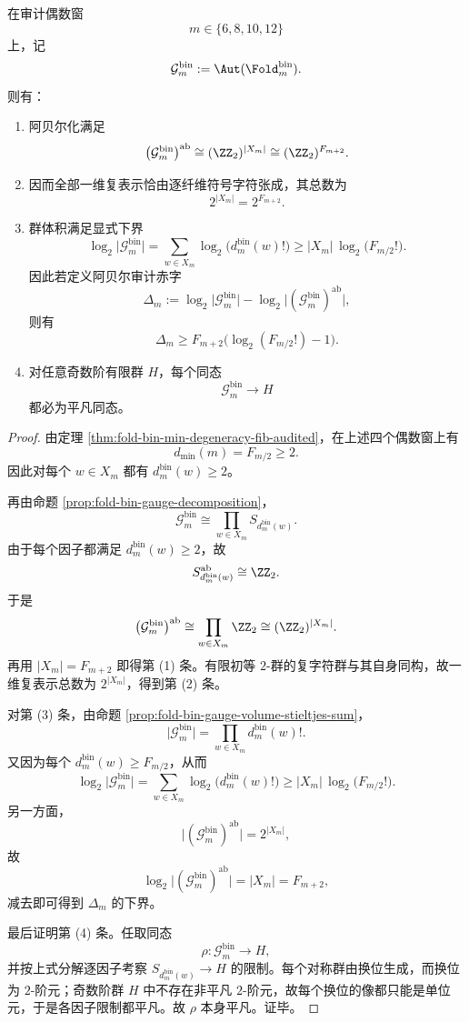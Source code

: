 \begin{theorem}\label{thm:gut-foldbin-gauge-abelian-visible-compression-even-audited}
在审计偶数窗
\[
m\in\{6,8,10,12\}
\]
上，记
\[
\mathcal G_m^{\mathrm{bin}}:=\Aut(\Fold_m^{\mathrm{bin}}).
\]
则有：
\begin{enumerate}
  \item 阿贝尔化满足
  \[
  \bigl(\mathcal G_m^{\mathrm{bin}}\bigr)^{\mathrm{ab}}
  \cong
  (\ZZ_2)^{|X_m|}
  \cong
  (\ZZ_2)^{F_{m+2}}.
  \]
  \item 因而全部一维复表示恰由逐纤维符号字符张成，其总数为
  \[
  2^{|X_m|}=2^{F_{m+2}}.
  \]
  \item 群体积满足显式下界
  \[
  \log_2\bigl|\mathcal G_m^{\mathrm{bin}}\bigr|
  =
  \sum_{w\in X_m}\log_2\bigl(d_m^{\mathrm{bin}}(w)!\bigr)
  \ge
  |X_m|\,\log_2\bigl(F_{m/2}!\bigr).
  \]
  因此若定义阿贝尔审计赤字
  \[
  \Delta_m
  :=
  \log_2\bigl|\mathcal G_m^{\mathrm{bin}}\bigr|
  -
  \log_2\bigl|(\mathcal G_m^{\mathrm{bin}})^{\mathrm{ab}}\bigr|,
  \]
  则有
  \[
  \Delta_m
  \ge
  F_{m+2}\bigl(\log_2(F_{m/2}!)-1\bigr).
  \]
  \item 对任意奇数阶有限群 \(H\)，每个同态
  \[
  \mathcal G_m^{\mathrm{bin}}\longrightarrow H
  \]
  都必为平凡同态。
\end{enumerate}
\end{theorem}
\begin{proof}
由定理 \ref{thm:fold-bin-min-degeneracy-fib-audited}，在上述四个偶数窗上有
\[
d_{\min}(m)=F_{m/2}\ge 2.
\]
因此对每个 \(w\in X_m\) 都有 \(d_m^{\mathrm{bin}}(w)\ge 2\)。

再由命题 \ref{prop:fold-bin-gauge-decomposition}，
\[
\mathcal G_m^{\mathrm{bin}}
\cong
\prod_{w\in X_m} S_{d_m^{\mathrm{bin}}(w)}.
\]
由于每个因子都满足 \(d_m^{\mathrm{bin}}(w)\ge 2\)，故
\[
S_{d_m^{\mathrm{bin}}(w)}^{\mathrm{ab}}\cong \ZZ_2.
\]
于是
\[
\bigl(\mathcal G_m^{\mathrm{bin}}\bigr)^{\mathrm{ab}}
\cong
\prod_{w\in X_m}\ZZ_2
\cong
(\ZZ_2)^{|X_m|}.
\]
再用 \(|X_m|=F_{m+2}\) 即得第 (1) 条。有限初等 \(2\)-群的复字符群与其自身同构，故一维复表示总数为 \(2^{|X_m|}\)，得到第 (2) 条。

对第 (3) 条，由命题 \ref{prop:fold-bin-gauge-volume-stieltjes-sum}，
\[
\bigl|\mathcal G_m^{\mathrm{bin}}\bigr|
=
\prod_{w\in X_m} d_m^{\mathrm{bin}}(w)!.
\]
又因为每个 \(d_m^{\mathrm{bin}}(w)\ge F_{m/2}\)，从而
\[
\log_2\bigl|\mathcal G_m^{\mathrm{bin}}\bigr|
=
\sum_{w\in X_m}\log_2\bigl(d_m^{\mathrm{bin}}(w)!\bigr)
\ge
|X_m|\,\log_2\bigl(F_{m/2}!\bigr).
\]
另一方面，
\[
\bigl|(\mathcal G_m^{\mathrm{bin}})^{\mathrm{ab}}\bigr|
=
2^{|X_m|},
\]
故
\[
\log_2\bigl|(\mathcal G_m^{\mathrm{bin}})^{\mathrm{ab}}\bigr|=|X_m|=F_{m+2},
\]
减去即可得到 \(\Delta_m\) 的下界。

最后证明第 (4) 条。任取同态
\[
\rho:\mathcal G_m^{\mathrm{bin}}\to H,
\]
并按上式分解逐因子考察 \(S_{d_m^{\mathrm{bin}}(w)}\to H\) 的限制。每个对称群由换位生成，而换位为 \(2\)-阶元；奇数阶群 \(H\) 中不存在非平凡 \(2\)-阶元，故每个换位的像都只能是单位元，于是各因子限制都平凡。故 \(\rho\) 本身平凡。证毕。
\end{proof}

